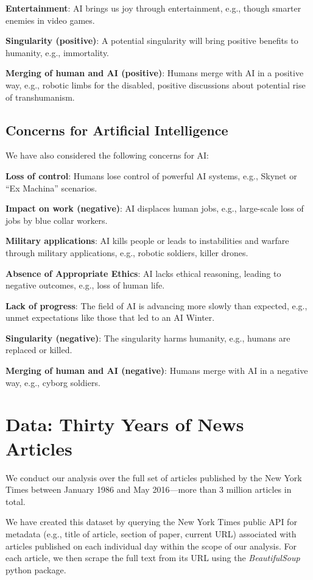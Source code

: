 \documentclass[letterpaper]{article}
\begin{document}
\textbf{Entertainment}: AI brings us joy through entertainment, e.g., though smarter enemies in video games.

\textbf{Singularity (positive)}: A potential singularity will bring positive benefits to humanity, e.g., immortality.

\textbf{Merging of human and AI (positive)}: Humans merge with AI in a positive way, e.g., robotic limbs for the disabled, positive discussions about potential rise of transhumanism.

\subsection{Concerns for Artificial Intelligence}

We have also considered the following concerns for AI:

\textbf{Loss of control}: Humans lose control of powerful AI systems, e.g., Skynet or ``Ex Machina'' scenarios.

\textbf{Impact on work (negative)}: AI displaces human jobs, e.g., large-scale loss of jobs by blue collar workers.

\textbf{Military applications}: AI kills people or leads to instabilities and warfare through military applications, e.g., robotic soldiers, killer drones.

\textbf{Absence of Appropriate Ethics}: AI lacks ethical reasoning, leading to negative outcomes, e.g., loss of human life.

\textbf{Lack of progress}: The field of AI is advancing more slowly than expected, e.g., unmet expectations like those that led to an AI Winter.

\textbf{Singularity (negative)}: The singularity harms humanity, e.g., humans are replaced or killed.

\textbf{Merging of human and AI (negative)}: Humans merge with AI in a negative way, e.g., cyborg soldiers.

\section{Data: Thirty Years of News Articles}

We conduct our analysis over the full set of articles published by the New York Times between January 1986 and May 2016---more than 3 million articles in total.

We have created this dataset by querying the New York Times public API for metadata (e.g., title of article, section of paper, current URL) associated with articles published on each individual day within the scope of our analysis. For each article, we then scrape the full text from its URL using the \textit{BeautifulSoup} python package.
\end{document}
